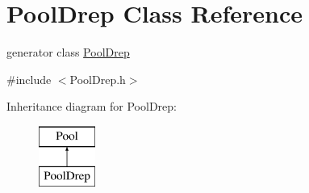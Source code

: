 \hypertarget{class_pool_drep}{}\section{Pool\+Drep Class Reference}
\label{class_pool_drep}


generator class \hyperlink{class_pool_drep}{Pool\+Drep}  




{\ttfamily \#include $<$Pool\+Drep.\+h$>$}

Inheritance diagram for Pool\+Drep\+:\begin{figure}[H]
\begin{center}
\leavevmode
\includegraphics[height=2.000000cm]{class_pool_drep}
\end{center}
\end{figure}

